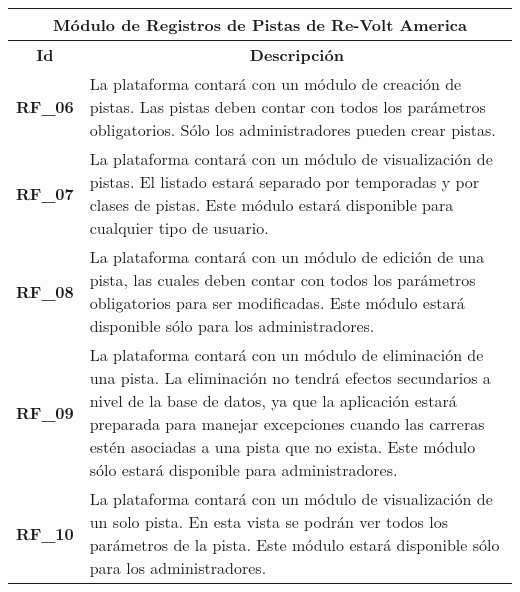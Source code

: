 \begin{center}
	\begin{tabular}{ | l | p{15cm} |}
		\hline
		\multicolumn{2}{|c|}{\textbf{Módulo de Registros de Pistas de Re-Volt America}} \\
		\hline
		\multicolumn{1}{|c|}{\textbf{Id}} & \multicolumn{1}{|c|}{\textbf{Descripción}} \\
		\hline
		{\textbf{RF\_06}} & La plataforma contará con un módulo de creación de pistas. Las pistas deben contar con todos los parámetros obligatorios. Sólo los administradores pueden crear pistas. \\ \hline
		
		{\textbf{RF\_07}} & La plataforma contará con un módulo de visualización de pistas. El listado estará separado por temporadas y por clases de pistas. Este módulo estará disponible para cualquier tipo de usuario. \\ \hline
		
		{\textbf{RF\_08}} & La plataforma contará con un módulo de edición de una pista, las cuales deben contar con todos los parámetros obligatorios para ser modificadas. Este módulo estará disponible sólo para los administradores. \\ \hline
		
		{\textbf{RF\_09}} & La plataforma contará con un módulo de eliminación de una pista. La eliminación no tendrá efectos secundarios a nivel de la base de datos, ya que la aplicación estará preparada para manejar excepciones cuando las carreras estén asociadas a una pista que no exista. Este módulo sólo estará disponible para administradores. \\ \hline
		
		{\textbf{RF\_10}} & La plataforma contará con un módulo de visualización de un solo pista. En esta vista se podrán ver todos los parámetros de la pista. Este módulo estará disponible sólo para los administradores. \\ \hline
	\end{tabular}
\end{center}

